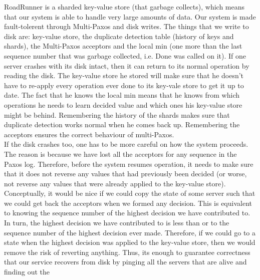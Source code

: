 \documentclass[a4paper]{article}
\begin{document}
RoadRunner is a sharded key-value store (that garbage collects), which means that our system is able to handle very large amounts of data.
Our system is made fault-tolerent through Multi-Paxos and disk writes.
The things that we write to disk are: key-value store, the duplicate detection table (history of keys and shards), the Multi-Paxos acceptors and the local min (one more than the last sequence number that was garbage collected, i.e. Done was called on it).
If one server crashes with its disk intact, then it can return to its normal operation by reading the disk.
The key-value store he stored will make sure that he doesn't have to re-apply every operation ever done to its key-vale store to get it up to date.
The fact that he knows the local min means that he knows from which operations he needs to learn decided value and which ones his key-value store might be behind. 
Remembering the history of the shards makes sure that duplicate detection works normal when he comes back up.
Remembering the acceptors  ensures the correct behaviour of multi-Paxos.\\
\indent If the disk crashes too, one has to be more careful on how the system proceeds.
The reason is because we have lost all the acceptors for any sequence in the Paxos log.
Therefore, before the system resumes operation, it needs to make sure that it does not reverse any values that had previously been  decided (or worse, not reverse any values that were already applied to the key-value store).
Conceptually, it would be nice if we could copy the state of some server such that we could get back the acceptors when we formed any decision.
This is equivalent to knowing the sequence number of the highest decision we have contributed to. 
In turn, the highest decision we have contributed to is less than or to the sequence number of the highest decision ever made.
Therefore, if we could go to a state when the highest decision was applied to the key-value store, then we would remove the risk of reverting anything. 
Thus, its enough to guarantee correctness that our service recovers from disk by pinging all the servers that are alive and finding out the
\end{document}
